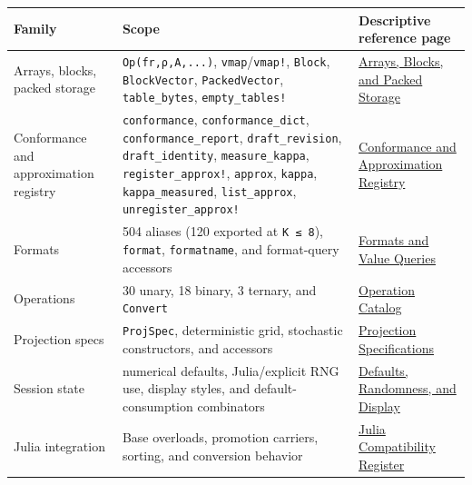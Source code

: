 \begin{table}[h]
\centering
\begin{tabulary}{\linewidth}{L L L}
\toprule
Family & Scope & Descriptive reference page \\
\toprule
Arrays, blocks, packed storage & \texttt{Op(fr,ρ,A,...)}, \texttt{vmap}/\allowbreak\texttt{vmap!}, \texttt{Block}, \texttt{BlockVector}, \texttt{PackedVector}, \texttt{table\_\allowbreak{}bytes}, \texttt{empty\_\allowbreak{}tables!} & \href{reference\_\allowbreak{}arrays\_\allowbreak{}blocks\_\allowbreak{}storage.md}{Arrays, Blocks, and Packed Storage} \\
Conformance and approximation registry & \texttt{conformance}, \texttt{conformance\_\allowbreak{}dict}, \texttt{conformance\_\allowbreak{}report}, \texttt{draft\_\allowbreak{}revision}, \texttt{draft\_\allowbreak{}identity}, \texttt{measure\_\allowbreak{}kappa}, \texttt{register\_\allowbreak{}approx!}, \texttt{approx}, \texttt{kappa}, \texttt{kappa\_\allowbreak{}measured}, \texttt{list\_\allowbreak{}approx}, \texttt{unregister\_\allowbreak{}approx!} & \href{reference\_\allowbreak{}conformance.md}{Conformance and Approximation Registry} \\
Formats & 504 aliases (120 exported at \texttt{K ≤ 8}), \texttt{format}, \texttt{formatname}, and format-query accessors & \href{reference\_\allowbreak{}formats\_\allowbreak{}values.md}{Formats and Value Queries} \\
Operations & 30 unary, 18 binary, 3 ternary, and \texttt{Convert} & \href{reference\_\allowbreak{}operations.md}{Operation Catalog} \\
Projection specs & \texttt{ProjSpec}, deterministic grid, stochastic constructors, and accessors & \href{reference\_\allowbreak{}projections.md}{Projection Specifications} \\
Session state & numerical defaults, Julia/explicit RNG use, display styles, and default-consumption combinators & \href{reference\_\allowbreak{}defaults\_\allowbreak{}random\_\allowbreak{}display.md}{Defaults, Randomness, and Display} \\
Julia integration & Base overloads, promotion carriers, sorting, and conversion behavior & \href{reference\_\allowbreak{}julia\_\allowbreak{}compat.md}{Julia Compatibility Register} \\
\bottomrule
\end{tabulary}

\end{table}



